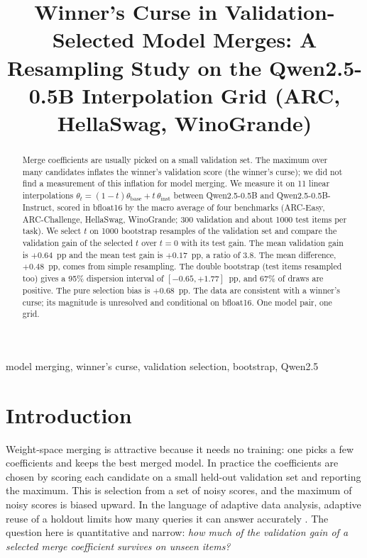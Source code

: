 \documentclass[conference]{IEEEtran}
\begin{document}
\title{Winner's Curse in Validation-Selected Model Merges: A Resampling Study on the Qwen2.5-0.5B Interpolation Grid (ARC, HellaSwag, WinoGrande)}

\author{
}

\maketitle

\begin{abstract}
Merge coefficients are usually picked on a small validation set. The maximum over many candidates inflates the winner's validation score (the winner's curse); we did not find a measurement of this inflation for model merging. We measure it on 11 linear interpolations $\theta_t=(1-t)\theta_{\text{base}}+t\,\theta_{\text{inst}}$ between Qwen2.5-0.5B and Qwen2.5-0.5B-Instruct, scored in bfloat16 by the macro average of four benchmarks (ARC-Easy, ARC-Challenge, HellaSwag, WinoGrande; 300 validation and about 1000 test items per task). We select $t$ on 1000 bootstrap resamples of the validation set and compare the validation gain of the selected $t$ over $t=0$ with its test gain. The mean validation gain is $+0.64$~pp and the mean test gain is $+0.17$~pp, a ratio of $3.8$. The mean difference, $+0.48$~pp, comes from simple resampling. The double bootstrap (test items resampled too) gives a 95\% dispersion interval of $[-0.65,+1.77]$~pp, and 67\% of draws are positive. The pure selection bias is $+0.68$~pp. The data are consistent with a winner's curse; its magnitude is unresolved and conditional on bfloat16. One model pair, one grid.
\end{abstract}

\begin{IEEEkeywords}
model merging, winner's curse, validation selection, bootstrap, Qwen2.5
\end{IEEEkeywords}

\section{Introduction}
Weight-space merging is attractive because it needs no training: one picks a few coefficients and keeps the best merged model. In practice the coefficients are chosen by scoring each candidate on a small held-out validation set and reporting the maximum. This is selection from a set of noisy scores, and the maximum of noisy scores is biased upward. In the language of adaptive data analysis, adaptive reuse of a holdout limits how many queries it can answer accurately \cite{dwork2014adaptive}. The question here is quantitative and narrow: \emph{how much of the validation gain of a selected merge coefficient survives on unseen items?}
\end{document}
